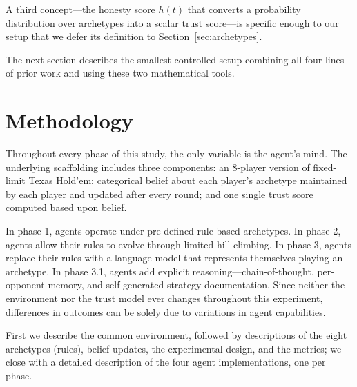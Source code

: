 \documentclass[10pt]{article} %
\begin{document}
A third concept---the honesty score $h(t)$ that converts a
probability distribution over archetypes into a scalar trust
score---is specific enough to our setup that we defer its
definition to Section~\ref{sec:archetypes}.

The next section describes the smallest controlled setup combining
all four lines of prior work and using these two mathematical tools.

\section{Methodology}

Throughout every phase of this study, the only variable is the
agent's mind. The underlying scaffolding includes three components:
an 8-player version of fixed-limit Texas Hold'em; categorical belief
about each player's archetype maintained by each player and updated
after every round; and one single trust score computed based upon
belief.

In phase 1, agents operate under pre-defined rule-based archetypes.
In phase 2, agents allow their rules to evolve through limited hill
climbing. In phase 3, agents replace their rules with a language
model that represents themselves playing an archetype. In phase 3.1,
agents add explicit reasoning---chain-of-thought, per-opponent
memory, and self-generated strategy documentation. Since neither the
environment nor the trust model ever changes throughout this
experiment, differences in outcomes can be solely due to variations
in agent capabilities.

First we describe the common environment, followed by descriptions
of the eight archetypes (rules), belief updates, the experimental
design, and the metrics; we close with a detailed description of the
four agent implementations, one per phase.
\end{document}
